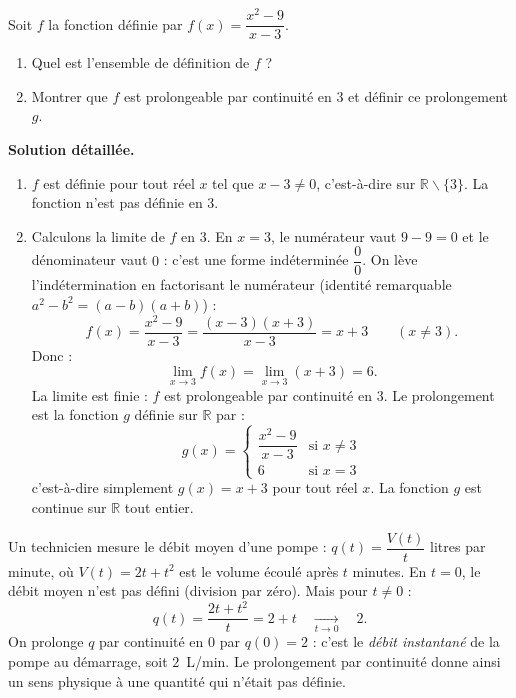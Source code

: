 \documentclass[11pt]{article}
\newcounter{popsec}
\newcounter{popsub}
\newcommand{\courssub}[1]{%
  \stepcounter{popsub}%
  \par\vspace{9pt}\noindent{\popxbold\fontsize{11.5}{13}\selectfont\color{popink}{\color{poporange}\thepopsec.\thepopsub}\hspace{6pt}#1}\par\nopagebreak\vspace{4pt}
}
\def\setminus{\mathbin{\backslash}}\let\smallsetminus\setminus
\begin{document}
\courssub{Exemples fondateurs}

\begin{exoresolu}[Prolongement de $f(x) = \dfrac{x^2 - 9}{x - 3}$ en $3$]
Soit $f$ la fonction définie par $f(x) = \dfrac{x^2 - 9}{x - 3}$.
\begin{enumerate}
\item Quel est l'ensemble de définition de $f$ ?
\item Montrer que $f$ est prolongeable par continuité en $3$ et définir ce prolongement $g$.
\end{enumerate}
\tcblower
\textbf{Solution détaillée.}
\begin{enumerate}
\item $f$ est définie pour tout réel $x$ tel que $x - 3 \neq 0$, c'est-à-dire sur $\mathbb{R} \setminus \{3\}$. La fonction n'est pas définie en $3$.
\item Calculons la limite de $f$ en $3$. En $x = 3$, le numérateur vaut $9 - 9 = 0$ et le dénominateur vaut $0$ : c'est une forme indéterminée $\dfrac{0}{0}$. On lève l'indétermination en factorisant le numérateur (identité remarquable $a^2 - b^2 = (a-b)(a+b)$) :
\[ f(x) = \dfrac{x^2 - 9}{x - 3} = \dfrac{(x-3)(x+3)}{x-3} = x + 3 \qquad (x \neq 3). \]
Donc :
\[ \lim_{x \to 3} f(x) = \lim_{x \to 3} (x+3) = 6. \]
La limite est finie : $f$ est prolongeable par continuité en $3$. Le prolongement est la fonction $g$ définie sur $\mathbb{R}$ par :
\[ g(x) = \begin{cases} \dfrac{x^2 - 9}{x - 3} & \text{si } x \neq 3 \\ 6 & \text{si } x = 3 \end{cases} \]
c'est-à-dire simplement $g(x) = x + 3$ pour tout réel $x$. La fonction $g$ est continue sur $\mathbb{R}$ tout entier.
\end{enumerate}
\end{exoresolu}

\begin{exemplebox}
Un technicien mesure le débit moyen d'une pompe : $q(t) = \dfrac{V(t)}{t}$ litres par minute, où $V(t) = 2t + t^2$ est le volume écoulé après $t$ minutes. En $t = 0$, le débit moyen n'est pas défini (division par zéro). Mais pour $t \neq 0$ :
\[ q(t) = \dfrac{2t + t^2}{t} = 2 + t \quad \xrightarrow[t \to 0]{} \quad 2. \]
On prolonge $q$ par continuité en $0$ par $q(0) = 2$ : c'est le \emph{débit instantané} de la pompe au démarrage, soit $2$~L/min. Le prolongement par continuité donne ainsi un sens physique à une quantité qui n'était pas définie.
\end{exemplebox}
\end{document}
